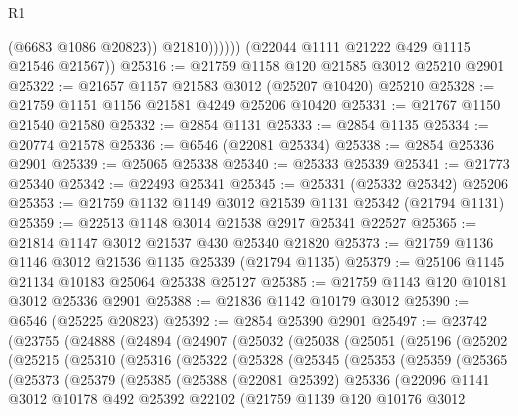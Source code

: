 \begin{lexlean}{R1}
\begin{coremodule}
                    (@6683 @1086 @20823))
                  @21810))))))
      (@22044 @1111 @21222 @429 @1115 @21546 @21567))
@25316 := @21759 @1158 @120 @21585 @3012 @25210 @2901
@25322 := @21657 @1157 @21583 @3012 (@25207 @10420) @25210
@25328 := @21759 @1151 @1156 @21581 @4249 @25206 @10420
@25331 := @21767 @1150 @21540 @21580
@25332 := @2854 @1131
@25333 := @2854 @1135
@25334 := @20774 @21578
@25336 := @6546 (@22081 @25334)
@25338 := @2854 @25336 @2901
@25339 := @25065 @25338
@25340 := @25333 @25339
@25341 := @21773 @25340
@25342 := @22493 @25341
@25345 := @25331 (@25332 @25342) @25206
@25353 := @21759 @1132 @1149 @3012 @21539 @1131 @25342 (@21794 @1131)
@25359 := @22513 @1148 @3014 @21538 @2917 @25341 @22527
@25365 := @21814 @1147 @3012 @21537 @430 @25340 @21820
@25373 := @21759 @1136 @1146 @3012 @21536 @1135 @25339 (@21794 @1135)
@25379 := @25106 @1145 @21134 @10183 @25064 @25338 @25127
@25385 := @21759 @1143 @120 @10181 @3012 @25336 @2901
@25388 := @21836 @1142 @10179 @3012
@25390 := @6546 (@25225 @20823)
@25392 := @2854 @25390 @2901
@25497 := @23742
    (@23755
      (@24888
        (@24894
          (@24907
            (@25032
              (@25038
                (@25051
                  (@25196
                    (@25202
                      (@25215
                        (@25310
                          (@25316
                            (@25322
                              (@25328
                                (@25345
                                  (@25353
                                    (@25359
                                      (@25365
                                        (@25373
                                          (@25379
                                            (@25385
                                              (@25388
                                                (@22081 @25392)
                                                @25336
                                                (@22096
                                                  @1141
                                                  @3012
                                                  @10178
                                                  @492
                                                  @25392
                                                  @22102
                                                  (@21759
                                                    @1139
                                                    @120
                                                    @10176
                                                    @3012

\end{coremodule}
\end{lexlean}

